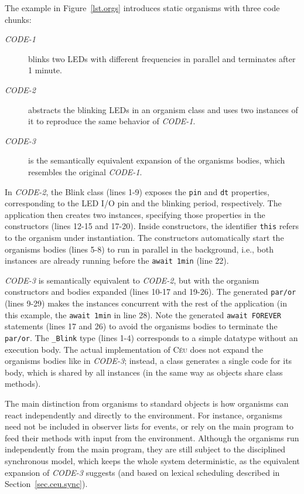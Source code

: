 \documentclass[preprint]{sigplanconf}
\newcommand{\CEU}{\textsc{C\'{e}u}\xspace}
\newcommand{\code}[1] {{\small{\texttt{#1}}}}
\newcommand{\1}{\;}
\newcommand{\2}{\;\;}
\newcommand{\3}{\;\;\;}
\newcommand{\5}{\;\;\;\;\;}
\begin{document}
The example in Figure~\ref{lst.orgs} introduces static organisms with three 
code chunks:
%
\begin{description}
\item[\emph{CODE-1}] blinks two LEDs with different frequencies in parallel and 
terminates after 1 minute.
%
\item[\emph{CODE-2}] abstracts the blinking LEDs in an organism class and uses 
two instances of it to reproduce the same behavior of \emph{CODE-1}.
%
\item[\emph{CODE-3}] is the semantically equivalent expansion of the organisms 
bodies, which resembles the original \emph{CODE-1}.
\end{description}
%
In \emph{CODE-2}, the Blink class (lines 1-9) exposes the \code{pin} and 
\code{dt} properties, corresponding to the LED I/O pin and the blinking period, 
respectively.
The application then creates two instances, specifying those properties in the 
constructors (lines 12-15 and 17-20).
Inside constructors, the identifier \code{this} refers to the organism under 
instantiation.
The constructors automatically start the organisms bodies (lines 5-8) to run in 
parallel in the background, i.e., both instances are already running before the 
\code{await 1min} (line 22).

\emph{CODE-3} is semantically equivalent to \emph{CODE-2}, but with the 
organism constructors and bodies expanded (lines 10-17 and 19-26).
The generated \code{par/or} (lines 9-29) makes the instances concurrent with 
the rest of the application (in this example, the \code{await 1min} in line 
28).
Note the generated \code{await FOREVER} statements (lines 17 and 26) to avoid 
the organisms bodies to terminate the \code{par/or}.
The \code{\_Blink} type (lines 1-4) corresponds to a simple datatype without an
execution body.
%
The actual implementation of \CEU does not expand the organisms bodies like in 
\emph{CODE-3}; instead, a class generates a single code for its body, which is 
shared by all instances (in the same way as objects share class methods).

The main distinction from organisms to standard objects is how organisms can 
react independently and directly to the environment.
%
For instance, organisms need not be included in observer lists for events, or 
rely on the main program to feed their methods with input from the environment.
%
Although the organisms run independently from the main program, they are still 
subject to the disciplined synchronous model, which keeps the whole system 
deterministic, as the equivalent expansion of \emph{CODE-3} suggests (and based 
on lexical scheduling described in Section~\ref{sec.ceu.sync}).
%
\end{document}
